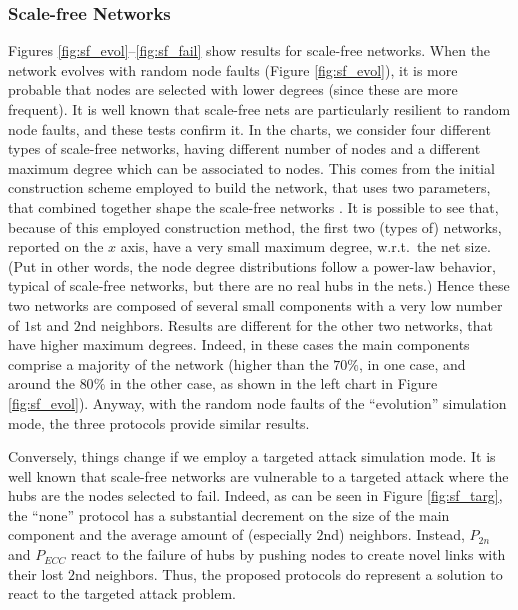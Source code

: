 \documentclass[10pt, conference, compsocconf]{IEEEtran}
\begin{document}
\subsubsection{Scale-free Networks}
Figures \ref{fig:sf_evol}--\ref{fig:sf_fail} show results for scale-free networks.
When the network evolves with random node faults (Figure \ref{fig:sf_evol}), it is more probable that nodes are selected with lower degrees (since these are more frequent). It is well known that scale-free nets are particularly resilient to random node faults, and these tests confirm it. 
In the charts, we consider four different types of scale-free networks, having different number of nodes and a different maximum degree which can be associated to nodes. This comes from the initial construction scheme employed to build the network, that uses two parameters, that combined together shape the scale-free networks \cite{Aiello00arandom}.
It is possible to see that, because of this employed construction method, the first two (types of) networks, reported on the $x$ axis, have a very small maximum degree, w.r.t.~the net size. (Put in other words, 
the node degree distributions follow a power-law behavior, typical of scale-free networks, but there are no real hubs in the nets.) Hence these two networks are composed of several small components with a very low number of $1$st and $2$nd neighbors. 
Results are different for the other two networks, that have higher maximum degrees. Indeed, in these cases the main components comprise a majority of the network (higher than the $70\%$, in one case, and around the $80\%$ in the other case, as shown in the left chart in Figure \ref{fig:sf_evol}).
Anyway, with the random node faults of the ``evolution'' simulation mode, the three protocols provide similar results.

Conversely, things change if we employ a targeted attack simulation mode. It is well known that scale-free networks are vulnerable to a targeted attack where the hubs are the nodes selected to fail. Indeed, as can be seen in Figure \ref{fig:sf_targ}, the ``none'' protocol has a substantial decrement on the size of the main component and the average amount of (especially $2$nd) neighbors.
Instead, $P_{2n}$ and $P_{ECC}$ react to the failure of hubs by pushing nodes to create novel links with their lost $2$nd neighbors. Thus, the proposed protocols do represent a solution to react to the targeted attack problem.
\end{document}
